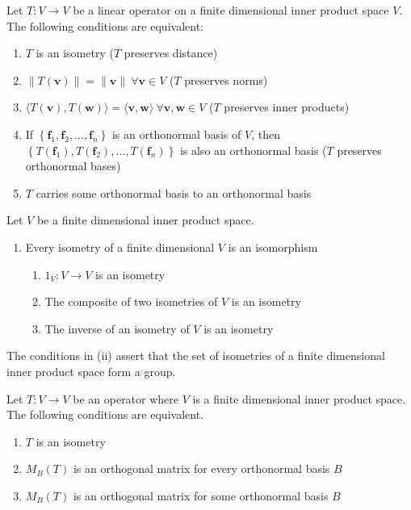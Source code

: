 \documentclass[12pt]{article}
\begin{document}
\begin{theorem}{}{}
    Let $ T : V \to V $ be a linear operator on a finite dimensional inner product space $ V $. The following conditions are equivalent:
    \begin{enumerate}[label=(\roman*)]
        \item $ T $ is an isometry ($ T $ preserves distance)
        \item $ \lVert T \left( \mathbf{v} \right) \rVert = \lVert \mathbf{v} \rVert \ \forall \mathbf{v} \in V $ ($ T $ preserves norms)
        \item $ \langle T \left( \mathbf{v} \right), T \left( \mathbf{w} \right) \rangle = \langle \mathbf{v}, \mathbf{w} \rangle \ \forall \mathbf{v}, \mathbf{w} \in V $ ($ T $ preserves inner products)
        \item If $ \left\{ \mathbf{f}_1, \mathbf{f}_2, \dots, \mathbf{f}_n \right\} $ is an orthonormal basis of $ V $, then $ \left\{ T \left( \mathbf{f}_1 \right), T \left( \mathbf{f}_2 \right), \dots, T \left( \mathbf{f}_n \right) \right\} $ is also an orthonormal basis ($ T $ preserves orthonormal bases)
        \item $ T $ carries some orthonormal basis to an orthonormal basis
    \end{enumerate}
\end{theorem}

\begin{corollary}{}{}
    Let $ V $ be a finite dimensional inner product space.
    \begin{enumerate}[label=(\roman*)]
        \item Every isometry of a finite dimensional $ V $ is an isomorphism
        \begin{enumerate}
            \item $ 1_V : V \to V $ is an isometry
            \item The composite of two isometries of $ V $ is an isometry
            \item The inverse of an isometry of $ V $ is an isometry
        \end{enumerate}
    \end{enumerate}
    The conditions in (ii) assert that the set of isometries of a finite dimensional inner product space form a group.
\end{corollary}

\begin{theorem}{}{}
    Let $ T : V \to V $ be an operator where $ V $ is a finite dimensional inner product space. The following conditions are equivalent.
    \begin{enumerate}[label=(\roman*)]
        \item $ T $ is an isometry
        \item $ M_B \left( T \right) $ is an orthogonal matrix for every orthonormal basis $ B $
        \item $ M_B \left( T \right) $ is an orthogonal matrix for some orthonormal basis $ B $
    \end{enumerate}
\end{theorem}
\end{document}
